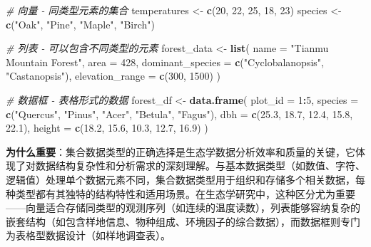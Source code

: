 \documentclass[
]{book}
\newenvironment{Shaded}{\begin{snugshade}}{\end{snugshade}}
\newcommand{\AttributeTok}[1]{\textcolor[rgb]{0.13,0.29,0.53}{#1}}
\newcommand{\CommentTok}[1]{\textcolor[rgb]{0.56,0.35,0.01}{\textit{#1}}}
\newcommand{\DecValTok}[1]{\textcolor[rgb]{0.00,0.00,0.81}{#1}}
\newcommand{\FloatTok}[1]{\textcolor[rgb]{0.00,0.00,0.81}{#1}}
\newcommand{\FunctionTok}[1]{\textcolor[rgb]{0.13,0.29,0.53}{\textbf{#1}}}
\newcommand{\NormalTok}[1]{#1}
\newcommand{\OtherTok}[1]{\textcolor[rgb]{0.56,0.35,0.01}{#1}}
\newcommand{\SpecialCharTok}[1]{\textcolor[rgb]{0.81,0.36,0.00}{\textbf{#1}}}
\newcommand{\StringTok}[1]{\textcolor[rgb]{0.31,0.60,0.02}{#1}}
\begin{document}
\begin{Shaded}
\begin{Highlighting}[]
\CommentTok{\# 向量 {-} 同类型元素的集合}
\NormalTok{temperatures }\OtherTok{\textless{}{-}} \FunctionTok{c}\NormalTok{(}\DecValTok{20}\NormalTok{, }\DecValTok{22}\NormalTok{, }\DecValTok{25}\NormalTok{, }\DecValTok{18}\NormalTok{, }\DecValTok{23}\NormalTok{)}
\NormalTok{species }\OtherTok{\textless{}{-}} \FunctionTok{c}\NormalTok{(}\StringTok{"Oak"}\NormalTok{, }\StringTok{"Pine"}\NormalTok{, }\StringTok{"Maple"}\NormalTok{, }\StringTok{"Birch"}\NormalTok{)}

\CommentTok{\# 列表 {-} 可以包含不同类型的元素}
\NormalTok{forest\_data }\OtherTok{\textless{}{-}} \FunctionTok{list}\NormalTok{(}
  \AttributeTok{name =} \StringTok{"Tianmu Mountain Forest"}\NormalTok{,}
  \AttributeTok{area =} \DecValTok{428}\NormalTok{,}
  \AttributeTok{dominant\_species =} \FunctionTok{c}\NormalTok{(}\StringTok{"Cyclobalanopsis"}\NormalTok{, }\StringTok{"Castanopsis"}\NormalTok{),}
  \AttributeTok{elevation\_range =} \FunctionTok{c}\NormalTok{(}\DecValTok{300}\NormalTok{, }\DecValTok{1500}\NormalTok{)}
\NormalTok{)}

\CommentTok{\# 数据框 {-} 表格形式的数据}
\NormalTok{forest\_df }\OtherTok{\textless{}{-}} \FunctionTok{data.frame}\NormalTok{(}
  \AttributeTok{plot\_id =} \DecValTok{1}\SpecialCharTok{:}\DecValTok{5}\NormalTok{,}
  \AttributeTok{species =} \FunctionTok{c}\NormalTok{(}\StringTok{"Quercus"}\NormalTok{, }\StringTok{"Pinus"}\NormalTok{, }\StringTok{"Acer"}\NormalTok{, }\StringTok{"Betula"}\NormalTok{, }\StringTok{"Fagus"}\NormalTok{),}
  \AttributeTok{dbh =} \FunctionTok{c}\NormalTok{(}\FloatTok{25.3}\NormalTok{, }\FloatTok{18.7}\NormalTok{, }\FloatTok{12.4}\NormalTok{, }\FloatTok{15.8}\NormalTok{, }\FloatTok{22.1}\NormalTok{),}
  \AttributeTok{height =} \FunctionTok{c}\NormalTok{(}\FloatTok{18.2}\NormalTok{, }\FloatTok{15.6}\NormalTok{, }\FloatTok{10.3}\NormalTok{, }\FloatTok{12.7}\NormalTok{, }\FloatTok{16.9}\NormalTok{)}
\NormalTok{)}
\end{Highlighting}
\end{Shaded}

\textbf{为什么重要}：集合数据类型的正确选择是生态学数据分析效率和质量的关键，它体现了对数据结构复杂性和分析需求的深刻理解。与基本数据类型（如数值、字符、逻辑值）处理单个数据元素不同，集合数据类型用于组织和存储多个相关数据，每种类型都有其独特的结构特性和适用场景。在生态学研究中，这种区分尤为重要------向量适合存储同类型的观测序列（如连续的温度读数），列表能够容纳复杂的嵌套结构（如包含样地信息、物种组成、环境因子的综合数据），而数据框则专门为表格型数据设计（如样地调查表）。
\end{document}

